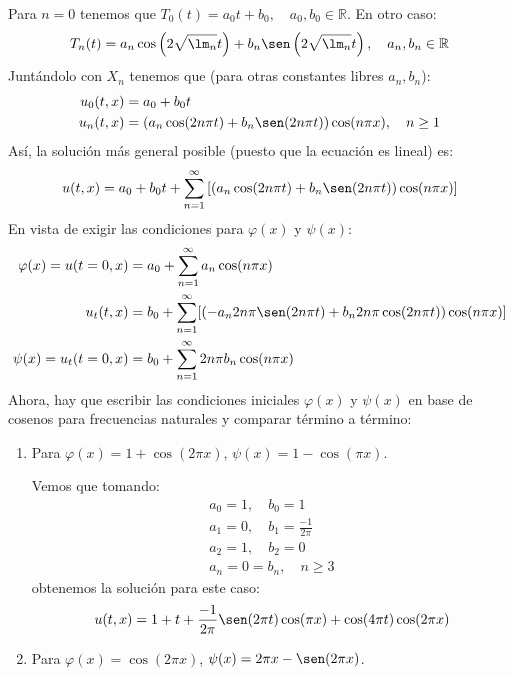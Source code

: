 \begin{ejemplo}
    \noindent
    Para $n=0$ tenemos que $T_0(t) = a_0t + b_0,\quad a_0,b_0\in \mathbb{R}$. En otro caso:
    \begin{equation*}
        T_n(t) = a_n\cos\left(2\sqrt{\lm_n}t\right) + b_n\sen\left(2\sqrt{\lm_n}t\right), \quad a_n,b_n\in \mathbb{R}
    \end{equation*}
    Juntándolo con $X_n$ tenemos que (para otras constantes libres $a_n,b_n$):
    \begin{align*}
        u_0(t,x) &= a_0 + b_0 t \\
        u_n(t,x) &= (a_n\cos(2n\pi t) + b_n\sen(2n\pi t))\cos(n\pi x), \quad n \geq 1
    \end{align*}
    Así, la solución más general posible (puesto que la ecuación es lineal) es:
    \begin{equation*}
        u(t,x) = a_0 + b_0 t + \sum_{n=1}^{\infty} \left[(a_n\cos(2n\pi t) + b_n\sen(2n\pi t))\cos(n\pi x)\right]
    \end{equation*}
    En vista de exigir las condiciones para $\varphi(x)$ y $\psi(x)$:
    \begin{align*}
        \varphi(x) = u(t=0,x) &= a_0 + \sum_{n=1}^{\infty} a_n\cos(n\pi x) \\
        u_t(t,x) &= b_0 + \sum_{n=1}^{\infty} [(-a_n2n\pi \sen(2n\pi t) + b_n2n\pi\cos(2n\pi t))\cos(n\pi x)] \\
        \psi(x) = u_t(t=0,x) &= b_0 + \sum_{n=1}^{\infty} 2n\pi b_n \cos(n\pi x)
    \end{align*}
    Ahora, hay que escribir las condiciones iniciales $\varphi(x)$ y $\psi(x)$ en base de cosenos para frecuencias naturales y comparar término a término:
    \begin{enumerate}[label=\alph*)]
        \item Para $\varphi(x) = 1+\cos(2\pi x)$, $\psi(x) = 1-\cos(\pi x)$.

            Vemos que tomando:
            \begin{gather*}
                a_0 = 1, \quad b_0 = 1  \\
                a_1 = 0, \quad b_1 = \frac{-1}{2\pi} \\
                a_2 = 1, \quad b_2 = 0 \\
                a_n = 0 = b_n, \quad n \geq 3
            \end{gather*}
            obtenemos la solución para este caso:
            \begin{equation*}
                u(t,x) = 1 + t + \frac{-1}{2\pi}\sen(2\pi t)\cos(\pi x) + \cos(4\pi t)\cos(2\pi x) 
            \end{equation*}
        \item Para $\varphi(x) = \cos(2\pi x)$, $\psi(x) = 2\pi x- \sen(2\pi x)$.


\end{enumerate}
\end{ejemplo}
